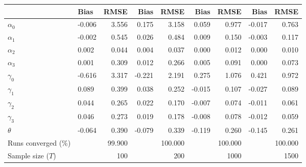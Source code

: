 
\begin{tabular}[t]{llrrrrrrr}
\toprule
  & Bias & RMSE & Bias & RMSE & Bias & RMSE & Bias & RMSE\\
\midrule
$\alpha_{0}$ & -0.006 & 3.556 & 0.175 & 3.158 & 0.059 & 0.977 & -0.017 & 0.763\\
$\alpha_{1}$ & -0.002 & 0.545 & 0.026 & 0.484 & 0.009 & 0.150 & -0.003 & 0.117\\
$\alpha_{2}$ & 0.002 & 0.044 & 0.004 & 0.037 & 0.000 & 0.012 & 0.000 & 0.010\\
$\alpha_{3}$ & 0.001 & 0.309 & 0.012 & 0.266 & 0.005 & 0.091 & 0.000 & 0.073\\
$\gamma_{0}$ & -0.616 & 3.317 & -0.221 & 2.191 & 0.275 & 1.076 & 0.421 & 0.972\\
$\gamma_{1}$ & 0.089 & 0.399 & 0.038 & 0.252 & -0.015 & 0.107 & -0.027 & 0.089\\
$\gamma_{2}$ & 0.044 & 0.265 & 0.022 & 0.170 & -0.007 & 0.074 & -0.011 & 0.061\\
$\gamma_{3}$ & 0.046 & 0.273 & 0.019 & 0.178 & -0.008 & 0.078 & -0.012 & 0.059\\
$\theta$ & -0.064 & 0.390 & -0.079 & 0.339 & -0.119 & 0.260 & -0.145 & 0.261\\
Runs converged (\%) &  & 99.900 &  & 100.000 &  & 100.000 &  & 100.000\\
Sample size ($T$) &  & 100 &  & 200 &  & 1000 &  & 1500\\
\bottomrule
\end{tabular}
